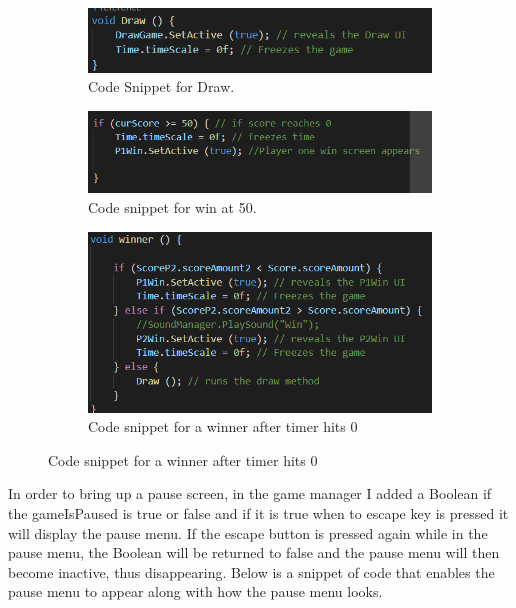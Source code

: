 \begin{figure}[h]
\begin{subfigure}{1\textwidth}
\centering
  \includegraphics[width= 1\linewidth]{Images/Draw.PNG}
  \caption{Code Snippet for Draw.}
  \label{fig:Draw}
  \end{subfigure}
  \newline
  \begin{subfigure}{1\textwidth}
\centering
  \includegraphics[width= 1\linewidth]{Images/ScoreWinner.PNG}
  \caption{Code snippet for win at 50.}
  \label{fig:scorewin}
  \end{subfigure}
  \newline
    \begin{subfigure}{1\textwidth}
\centering
  \includegraphics[width = 1\linewidth]{Images/ScoreWinnersCountdown.PNG}
  \caption{Code snippet for a winner after timer hits 0}
  \label{fig:countdown}
  \end{subfigure}
\end{figure}

In order to bring up a pause screen, in the game manager I added a Boolean if the gameIsPaused is true or false and if it is true when to escape key is pressed it will display the pause menu. If the escape button is pressed again while in the pause menu, the Boolean will be returned to false and the pause menu will then become inactive, thus disappearing. Below is a snippet of code that enables the pause menu to appear along with how the pause menu looks.

